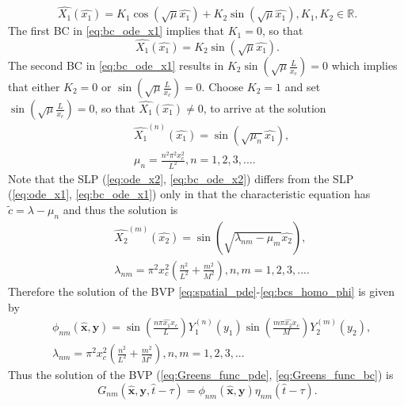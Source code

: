 \documentclass[\main/thesis.tex]{subfiles}
\begin{document}
\begin{equation*}
	\hat{X_1}(\hat{x_1}) {=} K_1 \cos(\sqrt{\mu} \hat{x_1})
	         {+} K_2 \sin(\sqrt{\mu} \hat{x_1}), 
	K_1, K_2 {\in} \mathbb{R}.
\end{equation*}
The first BC in \eqref{eq:bc_ode_x1} implies that $K_1 {=} 0$, so that
\begin{equation*}
	\hat{X_1}(\hat{x_1}) {=} K_2 \sin(\sqrt{\mu} \hat{x_1}).
\end{equation*}
The second BC in \eqref{eq:bc_ode_x1} results in $K_2 \sin\left(\sqrt{\mu} \frac{L}{x_c}\right) {=} 0$
which implies that either $K_2 {=} 0$ or $\sin\left(\sqrt{\mu} \frac{L}{x_c}\right) {=} 0$. 
Choose $K_2 {=} 1$ and set $\sin\left(\sqrt{\mu} \frac{L}{x_c}\right) {=} 0$, so that $\hat{X_1}(\hat{x_1}) {\ne} 0$,
to arrive at the solution
\begin{align*}
	&\hat{X_1}^{(n)}(\hat{x_1}) {=} \sin(\sqrt{\mu_n} \hat{x_1}), \\
	&\mu_n     {=} \frac{n^2 \pi^2 x_c^2}
	                    {L^2},
	 n {=} 1, 2, 3, ....
\end{align*}
Note that the SLP (\ref{eq:ode_x2}, \ref{eq:bc_ode_x2}) differs from the SLP 
(\ref{eq:ode_x1}, \ref{eq:bc_ode_x1}) only in that the characteristic equation has 
$\tilde{c} {=} \lambda {-} \mu_n$ and thus the solution is
\begin{align*}
	&\hat{X_2}^{(m)}(\hat{x_2}) {=} \sin(\sqrt{\lambda_{nm} {-} \mu_m} \hat{x_2}), \\
	&\lambda_{nm} {=} \pi^2 x_c^2 \left(\frac{n^2}{L^2} {+} \frac{m^2}{M^2}\right),
	 n, m {=} 1, 2, 3, ....
\end{align*}
Therefore the solution of the BVP 
\eqref{eq:spatial_pde}-\eqref{eq:bcs_homo_phi} is given by
\begin{align}
	&\phi_{nm}(\boldsymbol{\hat{x}}, \boldsymbol{y}) 
	 {=} \sin\left(\frac{n \pi \hat{x_1} x_c}{L}\right)Y_1^{(n)}(y_1)
	     \sin\left(\frac{m \pi \hat{x_2} x_c}{M}\right)Y_2^{(m)}(y_2),
	 \label{eq:spatial_sol} \\
	&\lambda_{nm} {=} \pi^2 x_c^2 \left(\frac{n^2}{L^2} {+} \frac{m^2}{M^2}\right),
	 n, m {=} 1, 2, 3, ...
	 \label{eq:sep_const}
\end{align}
Thus the solution of the BVP (\ref{eq:Greens_func_pde}, \ref{eq:Greens_func_bc}) is
\begin{equation*}
	G_{nm}(\boldsymbol{\hat{x}}, \boldsymbol{y}, \hat{t}{-}\tau) {=} \phi_{nm}(\boldsymbol{\hat{x}}, \boldsymbol{y}) \eta_{nm}(\hat{t}{-}\tau).
\end{equation*}
\end{document}
